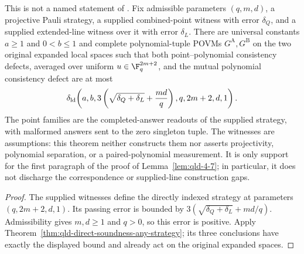 \begin{theorem}
\label{thm:qld-supplied-direct-polynomial-consistency}
\leanok
{}
This is not a named statement of \cite{Ji2020MIPStar}. Fix admissible parameters
$(q,m,d)$, a projective Pauli strategy, a supplied combined-point witness with
error $\delta_Q$, and a supplied extended-line witness over it with error
$\delta_L$. There are universal constants $a\geq1$ and $0<b\leq1$ and complete
polynomial-tuple POVMs $G^{\mathrm A},G^{\mathrm B}$ on the two original
expanded local spaces such that both point--polynomial consistency defects,
averaged over uniform $u\in\F_q^{2m+2}$, and the mutual polynomial consistency
defect are at most
\[
 \delta_{\rm ld}\!\left(a,b,
  3\left(\sqrt{\delta_Q+\delta_L}+\frac{md}{q}\right),
  q,2m+2,d,1\right).
\]
The point families are the completed-answer readouts of the supplied strategy,
with malformed answers sent to the zero singleton tuple. The witnesses are
assumptions: this theorem neither constructs them nor asserts projectivity,
polynomial separation, or a paired-polynomial measurement. It is only support
for the first paragraph of the proof of Lemma~\ref{lem:qld-4-7}; in particular,
it does not discharge the correspondence or supplied-line construction gaps.
\end{theorem}
\begin{proof}
\leanok
{}
The supplied witnesses define the directly indexed strategy at parameters
$(q,2m+2,d,1)$. Its passing error is bounded by
$3(\sqrt{\delta_Q+\delta_L}+md/q)$. Admissibility gives $m,d\geq1$ and $q>0$,
so this error is positive. Apply
Theorem~\ref{thm:qld-direct-soundness-any-strategy}; its three conclusions have
exactly the displayed bound and already act on the original expanded spaces.
\end{proof}

